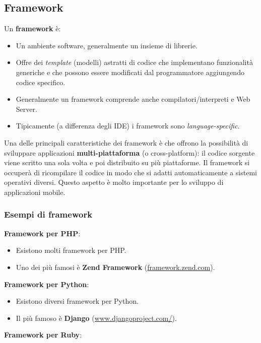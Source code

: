 \subsection{Framework}

Un \textbf{framework} è:

\begin{itemize}
    \item Un ambiente software, generalmente un insieme di librerie.
    \item Offre dei \emph{template} (modelli) astratti di codice che implementano funzionalità generiche e che possono essere modificati dal programmatore aggiungendo codice specifico.
    \item Generalmente un framework comprende anche compilatori/interpreti e Web Server.
    \item Tipicamente (a differenza degli IDE) i framework sono \emph{language-specific}.
\end{itemize}

Una delle principali caratteristiche dei framework è che offrono la possibilità di sviluppare applicazioni \textbf{multi-piattaforma} (o cross-platform): il codice sorgente viene scritto una sola volta e poi distribuito su più piattaforme. Il framework si occuperà di ricompilare il codice in modo che si adatti automaticamente a sistemi operativi diversi. Questo aspetto è molto importante per lo sviluppo di applicazioni mobile.

\subsubsection*{Esempi di framework}

\textbf{Framework per PHP}:

\begin{itemize}
    \item Esistono molti framework per PHP.
    \item Uno dei più famosi è \textbf{Zend Framework} (\url{framework.zend.com}).
\end{itemize}

\textbf{Framework per Python}:

\begin{itemize}
    \item Esistono diversi framework per Python.
    \item Il più famoso è \textbf{Django} (\url{www.djangoproject.com/}).
\end{itemize}

\textbf{Framework per Ruby}:

